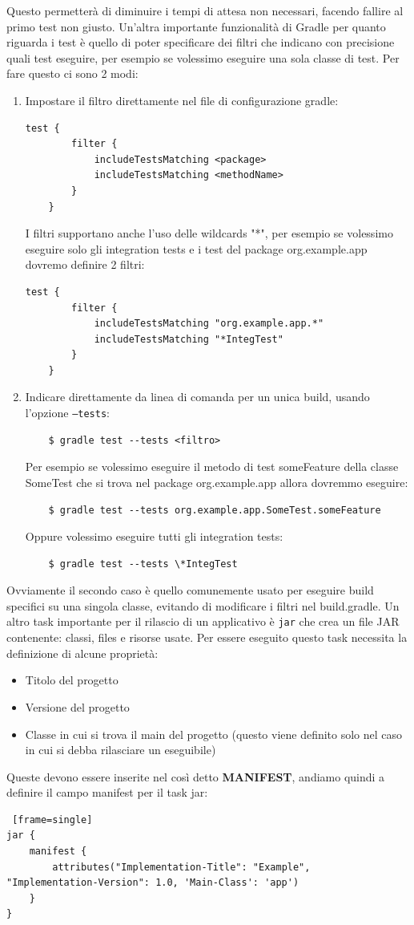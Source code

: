 Questo permetterà di diminuire i tempi di attesa non necessari, facendo fallire al primo test non giusto. Un'altra importante funzionalità di Gradle per quanto riguarda i test è quello di poter specificare dei filtri che indicano con precisione quali test eseguire, per esempio se volessimo eseguire una sola classe di test. Per fare questo ci sono 2 modi:
\begin{enumerate}
    \item Impostare il filtro direttamente nel file di configurazione gradle:
    \begin{lstlisting}[frame=single]
    test {
        filter {
            includeTestsMatching <package>
            includeTestsMatching <methodName>
        }
    }
    \end{lstlisting}
    I filtri supportano anche l'uso delle wildcards "*", per esempio se volessimo eseguire solo gli integration tests e i test del package org.example.app dovremo definire 2 filtri:
    \begin{lstlisting}[frame=single]
    test {
        filter {
            includeTestsMatching "org.example.app.*"
            includeTestsMatching "*IntegTest"
        }
    }
    \end{lstlisting}
    \item Indicare direttamente da linea di comanda per un unica build, usando l'opzione \texttt{--tests}:
    \begin{verbatim}
    $ gradle test --tests <filtro> \end{verbatim}
    Per esempio se volessimo eseguire il metodo di test someFeature della classe SomeTest che si trova nel package org.example.app allora dovremmo eseguire:
    \begin{verbatim}
    $ gradle test --tests org.example.app.SomeTest.someFeature \end{verbatim}
    Oppure volessimo eseguire tutti gli integration tests:
    \begin{verbatim}
    $ gradle test --tests \*IntegTest \end{verbatim}
\end{enumerate}
Ovviamente il secondo caso è quello comunemente usato per eseguire build specifici su una singola classe, evitando di modificare i filtri nel build.gradle. Un altro task importante per il rilascio di un applicativo è \texttt{jar} che crea un file JAR contenente: classi, files e risorse usate. Per essere eseguito questo task necessita la definizione di alcune proprietà:
\begin{itemize}
    \item Titolo del progetto 
    \item Versione del progetto 
    \item Classe in cui si trova il main del progetto (questo viene definito solo nel caso in cui si debba rilasciare un eseguibile) 
\end{itemize}
Queste devono essere inserite nel così detto \textbf{MANIFEST}, andiamo quindi a definire il campo manifest per il task jar:
\begin{lstlisting} [frame=single]
jar {
    manifest {
        attributes("Implementation-Title": "Example",  "Implementation-Version": 1.0, 'Main-Class': 'app')
    }    
}
\end{lstlisting}